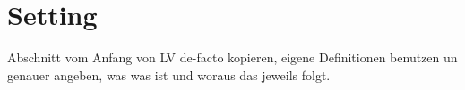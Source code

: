 \section{Setting}
Abschnitt vom Anfang von LV de-facto kopieren, eigene Definitionen benutzen un
genauer angeben, was was ist und woraus das jeweils folgt.
